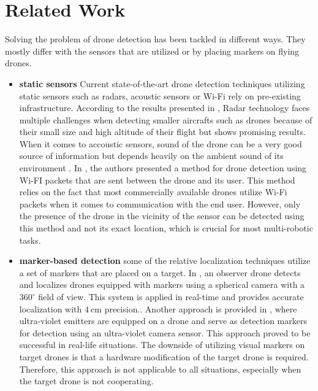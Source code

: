 \documentclass[twoside]{ctuthesis}
\theoremstyle{plain}
\theoremstyle{definition}
\theoremstyle{note}
\begin{document}
\section{Related Work}
Solving the problem of drone detection has been tackled in different ways. They mostly differ with the sensors that are utilized or by placing markers on flying drones.
\begin{itemize}
	\item \textbf{static sensors} Current state-of-the-art drone detection techniques utilizing static sensors such as radars, acoustic sensors or Wi-Fi rely on pre-existing infrastructure. According to the results presented in \cite{8337899}, Radar technology faces multiple challenges when detecting smaller aircrafts such as drones because of their small size and high altitude of their flight but shows promising results. When it comes to accoustic sensors, sound of the drone can be a very good source of information but depends heavily on the ambient sound of its environment \cite{8337899}. In \cite{drone-det-wifi}, the authors presented a method for drone detection using Wi-FI packets that are sent between the drone and its user. This method relies on the fact that most commercially available drones utilize Wi-Fi packets when it comes to communication with the end user. However, only the presence of the drone in the vicinity of the sensor can be detected using this method and not its exact location, which is crucial for most multi-robotic tasks.
	\item \textbf{marker-based detection} some of the relative localization techniques utilize a set of markers that are placed on a target. In \cite{holter2020relative}, an observer drone detects and localizes drones equipped with markers using a spherical camera with a $360^\circ$ field of view. This system is applied in real-time and provides accurate localization with $\SI{4}{\centi \metre}$ precision.. Another approach is provided in \cite{8651535}, where ultra-violet emitters are equipped on a drone and serve as detection markers for detection using an ultra-violet camera sensor. This approach proved to be successful in real-life situations. The downside of utilizing visual markers on target drones is that a hardware modification of the target drone is required. Therefore, this approach is not applicable to all situations, especially when the target drone is not cooperating.

\end{itemize}
\end{document}
